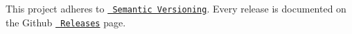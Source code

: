 This project adheres to \href{http://semver.org/}{\texttt{ Semantic Versioning}}. Every release is documented on the Github \href{https://github.com/waysact/webpack-subresource-integrity/releases}{\texttt{ Releases}} page. 